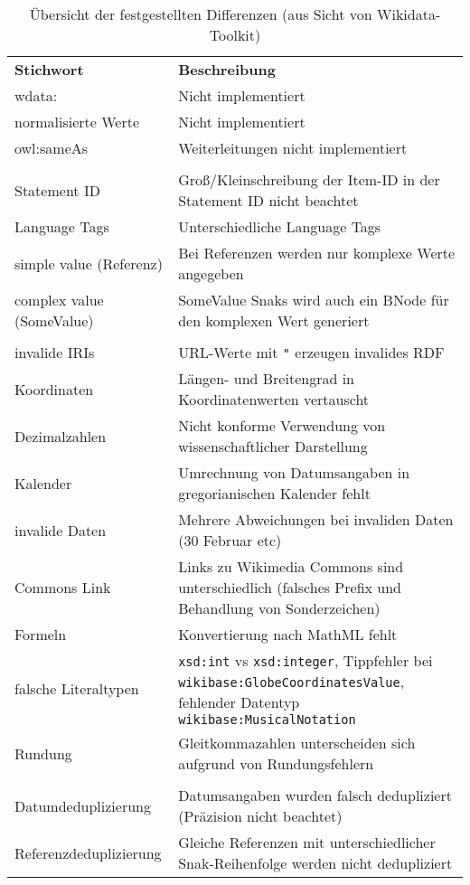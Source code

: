 \begin{table}
  \begin{tabular}{lp{}}
    \bfseries{Stichwort} & \bfseries{Beschreibung} \\
    wdata: & Nicht implementiert \\
    normalisierte Werte & Nicht implementiert \\
    owl:sameAs & Weiterleitungen nicht implementiert \\
    \\
    Statement ID & Groß/Kleinschreibung der Item-ID in der Statement ID nicht beachtet \\
    Language Tags & Unterschiedliche Language Tags \\
    simple value (Referenz) & Bei Referenzen werden nur komplexe Werte angegeben \\
    complex value (SomeValue) & SomeValue Snaks wird auch ein BNode für den komplexen Wert generiert \\
    \\
    invalide IRIs & URL-Werte mit \verb|"| erzeugen invalides RDF \\
    Koordinaten & Längen- und Breitengrad in Koordinatenwerten vertauscht \\
    Dezimalzahlen & Nicht konforme Verwendung von wissenschaftlicher Darstellung \\
    Kalender & Umrechnung von Datumsangaben in gregorianischen Kalender fehlt \\
    invalide Daten & Mehrere Abweichungen bei invaliden Daten (30 Februar etc) \\
    Commons Link & Links zu Wikimedia Commons sind unterschiedlich (falsches Prefix und Behandlung von Sonderzeichen) \\
    Formeln & Konvertierung nach MathML fehlt \\
    falsche Literaltypen & \verb|xsd:int| vs \verb|xsd:integer|, Tippfehler bei \verb|wikibase:GlobeCoordinatesValue|, fehlender Datentyp \verb|wikibase:MusicalNotation| \\
    Rundung & Gleitkommazahlen unterscheiden sich aufgrund von Rundungsfehlern \\
    \\
    Datumdeduplizierung & Datumsangaben wurden falsch dedupliziert (Präzision nicht beachtet) \\
    Referenzdeduplizierung & Gleiche Referenzen mit unterschiedlicher Snak-Reihenfolge werden nicht dedupliziert \\
  \end{tabular}
  \caption{Übersicht der festgestellten Differenzen (aus Sicht von Wikidata-Toolkit)}
  \label{tab:wdtk-diff}
\end{table}

